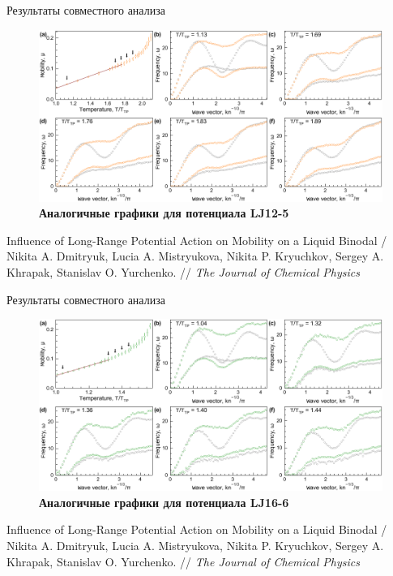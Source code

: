 \documentclass{beamer}
\begin{document}
\begin{frame}{Результаты совместного анализа}
\footnotesize{

\begin{figure}
\centering
\includegraphics[width=\textwidth]{MACR-Figure6}
\caption{\footnotesize \textbf{Аналогичные графики для потенциала LJ12-5}}
\label{Figure4}
\end{figure}

}

\tiny{Influence of Long-Range Potential Action on Mobility on a Liquid Binodal / Nikita A. Dmitryuk, Lucia A. Mistryukova, Nikita P. Kryuchkov, Sergey A. Khrapak, Stanislav O. Yurchenko. // \textit{The Journal of Chemical Physics}}
\end{frame}




\begin{frame}{Результаты совместного анализа}
\footnotesize{

\begin{figure}
\centering
\includegraphics[width=\textwidth]{MACR-Figure7}
\caption{\footnotesize \textbf{Аналогичные графики для потенциала LJ16-6}}
\label{Figure4}
\end{figure}

}

\tiny{Influence of Long-Range Potential Action on Mobility on a Liquid Binodal / Nikita A. Dmitryuk, Lucia A. Mistryukova, Nikita P. Kryuchkov, Sergey A. Khrapak, Stanislav O. Yurchenko. // \textit{The Journal of Chemical Physics}}
\end{frame}
\end{document}
